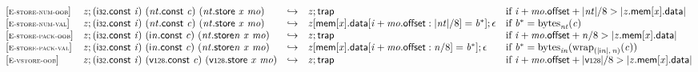 $$
\begin{array}{@{}l@{}lcl@{}l@{}}
{[\textsc{\scriptsize E{-}store{-}num{-}oob}]} \quad & {\mathit{z}} ; (\mathsf{i{\scriptstyle32}}.\mathsf{const}~{\mathit{i}})~({\mathit{nt}}.\mathsf{const}~{\mathit{c}})~({\mathit{nt}}.\mathsf{store}~{\mathit{x}}~{\mathit{mo}}) &\hookrightarrow& {\mathit{z}} ; \mathsf{trap} &\quad
  \mbox{if}~{\mathit{i}} + {\mathit{mo}}.\mathsf{offset} + {|{\mathit{nt}}|} / 8 > {|{{\mathit{z}}.\mathsf{mem}}{{}[{\mathit{x}}]}.\mathsf{data}|} \\
{[\textsc{\scriptsize E{-}store{-}num{-}val}]} \quad & {\mathit{z}} ; (\mathsf{i{\scriptstyle32}}.\mathsf{const}~{\mathit{i}})~({\mathit{nt}}.\mathsf{const}~{\mathit{c}})~({\mathit{nt}}.\mathsf{store}~{\mathit{x}}~{\mathit{mo}}) &\hookrightarrow& {\mathit{z}}{}[\mathsf{mem}{}[{\mathit{x}}].\mathsf{data}{}[{\mathit{i}} + {\mathit{mo}}.\mathsf{offset} : {|{\mathit{nt}}|} / 8] = {{\mathit{b}}^\ast}] ; \epsilon &\quad
  \mbox{if}~{{\mathit{b}}^\ast} = {{\mathrm{bytes}}}_{{\mathit{nt}}}({\mathit{c}}) \\
{[\textsc{\scriptsize E{-}store{-}pack{-}oob}]} \quad & {\mathit{z}} ; (\mathsf{i{\scriptstyle32}}.\mathsf{const}~{\mathit{i}})~({\mathsf{i}}{{\mathit{n}}}.\mathsf{const}~{\mathit{c}})~({{\mathit{nt}}.\mathsf{store}}{{\mathit{n}}}~{\mathit{x}}~{\mathit{mo}}) &\hookrightarrow& {\mathit{z}} ; \mathsf{trap} &\quad
  \mbox{if}~{\mathit{i}} + {\mathit{mo}}.\mathsf{offset} + {\mathit{n}} / 8 > {|{{\mathit{z}}.\mathsf{mem}}{{}[{\mathit{x}}]}.\mathsf{data}|} \\
{[\textsc{\scriptsize E{-}store{-}pack{-}val}]} \quad & {\mathit{z}} ; (\mathsf{i{\scriptstyle32}}.\mathsf{const}~{\mathit{i}})~({\mathsf{i}}{{\mathit{n}}}.\mathsf{const}~{\mathit{c}})~({{\mathit{nt}}.\mathsf{store}}{{\mathit{n}}}~{\mathit{x}}~{\mathit{mo}}) &\hookrightarrow& {\mathit{z}}{}[\mathsf{mem}{}[{\mathit{x}}].\mathsf{data}{}[{\mathit{i}} + {\mathit{mo}}.\mathsf{offset} : {\mathit{n}} / 8] = {{\mathit{b}}^\ast}] ; \epsilon &\quad
  \mbox{if}~{{\mathit{b}}^\ast} = {{\mathrm{bytes}}}_{{{\mathit{i}}}{{\mathit{n}}}}({{{\mathrm{wrap}}}_{({|{\mathsf{i}}{{\mathit{n}}}|},\, {\mathit{n}})}}{({\mathit{c}})}) \\
{[\textsc{\scriptsize E{-}vstore{-}oob}]} \quad & {\mathit{z}} ; (\mathsf{i{\scriptstyle32}}.\mathsf{const}~{\mathit{i}})~(\mathsf{v{\scriptstyle128}}.\mathsf{const}~{\mathit{c}})~(\mathsf{v{\scriptstyle128}.store}~{\mathit{x}}~{\mathit{mo}}) &\hookrightarrow& {\mathit{z}} ; \mathsf{trap} &\quad
  \mbox{if}~{\mathit{i}} + {\mathit{mo}}.\mathsf{offset} + {|\mathsf{v{\scriptstyle128}}|} / 8 > {|{{\mathit{z}}.\mathsf{mem}}{{}[{\mathit{x}}]}.\mathsf{data}|} \\

\end{array}$$
